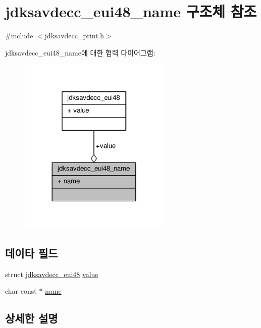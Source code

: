 \hypertarget{structjdksavdecc__eui48__name}{}\section{jdksavdecc\+\_\+eui48\+\_\+name 구조체 참조}
\label{structjdksavdecc__eui48__name}


{\ttfamily \#include $<$jdksavdecc\+\_\+print.\+h$>$}



jdksavdecc\+\_\+eui48\+\_\+name에 대한 협력 다이어그램\+:
\nopagebreak
\begin{figure}[H]
\begin{center}
\leavevmode
\includegraphics[width=204pt]{structjdksavdecc__eui48__name__coll__graph}
\end{center}
\end{figure}
\subsection*{데이타 필드}
\begin{DoxyCompactItemize}
\item 
struct \hyperlink{structjdksavdecc__eui48}{jdksavdecc\+\_\+eui48} \hyperlink{structjdksavdecc__eui48__name_a71faefd0701337de76f7672991d987c0}{value}
\item 
char const $\ast$ \hyperlink{structjdksavdecc__eui48__name_a5f1de76dd5d451949e12c0fbc966ca70}{name}
\end{DoxyCompactItemize}


\subsection{상세한 설명}


